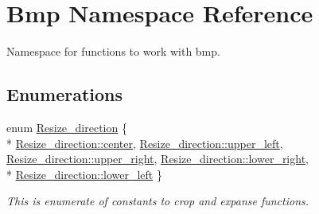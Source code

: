 \hypertarget{namespaceBmp}{}\section{Bmp Namespace Reference}
\label{namespaceBmp}


Namespace for functions to work with bmp.  


\subsection*{Enumerations}
\begin{DoxyCompactItemize}
\item 
enum \hyperlink{namespaceBmp_a17aedbe2a7f4fccdb8542a417187eea7}{Resize\+\_\+direction} \{ \\*
\hyperlink{namespaceBmp_a17aedbe2a7f4fccdb8542a417187eea7aadb115059e28d960fa8badfac5516667}{Resize\+\_\+direction\+::center}, 
\hyperlink{namespaceBmp_a17aedbe2a7f4fccdb8542a417187eea7a3f34ebfdc06155d551b08c312bcbb887}{Resize\+\_\+direction\+::upper\+\_\+left}, 
\hyperlink{namespaceBmp_a17aedbe2a7f4fccdb8542a417187eea7ae2737351ff33200a51dd13b033212b86}{Resize\+\_\+direction\+::upper\+\_\+right}, 
\hyperlink{namespaceBmp_a17aedbe2a7f4fccdb8542a417187eea7a9e516376e65d5f93e5be1edfe72522c6}{Resize\+\_\+direction\+::lower\+\_\+right}, 
\\*
\hyperlink{namespaceBmp_a17aedbe2a7f4fccdb8542a417187eea7a67554c25267171d1850889601cecf8a1}{Resize\+\_\+direction\+::lower\+\_\+left}
 \}\begin{DoxyCompactList}\small\item\em This is enumerate of constants to crop and expanse functions. \end{DoxyCompactList}
\end{DoxyCompactItemize}

